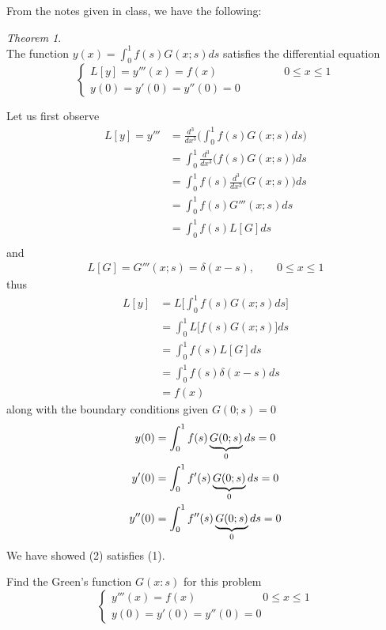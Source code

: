 \documentclass[12pt]{article}
\newenvironment{subproblem}[2][Part]{\begin{trivlist}
  \item[\hskip \labelsep {\bfseries #1}\hskip \labelsep {\bfseries (#2)}]}{\end{trivlist}}
\newenvironment{solution}[1][Solution]{\begin{trivlist}
  \item[\hskip \labelsep {\bfseries #1} \hskip \labelsep]}{\end{trivlist}}
\theoremstyle{remark}
\newtheorem*{theorem*}{Theorem}
\begin{document}
\begin{solution}
  $ $\\
  From the notes given in class, we have the following:
  \begin{theorem*}{}
    $ $\\
    The function \(y(x) = \int_{0}^{1}f(s)G(x;s)ds\)
    satisfies the differential equation
    \[
      \left\{
        \begin{array}{ll}
          L[y] = y'''(x) = f(x) \qquad\qquad\qquad 0 \le x \le 1 \\
          y(0) = y'(0) = y''(0) = 0
        \end{array}
      \right.
    \]
  \end{theorem*}
  $ $\\
  Let us first observe
  \begin{align*}
    L[y] = y''' &= \frac{d^3}{dx^3}\big(\int_{0}^{1}f(s)G(x;s)ds\big) \\
                &= \int_{0}^{1}\frac{d^3}{dx^3}\big(f(s)G(x;s)\big)ds \\
                &= \int_{0}^{1}f(s)\frac{d^3}{dx^3}\big(G(x;s)\big)ds \\
                &= \int_{0}^{1}f(s)G'''(x;s)ds \\    
                &= \int_{0}^{1}f(s)L[G]ds \\
  \end{align*}
  and
  \begin{align*}
    L[G] = G'''(x;s) = \delta(x-s), \qquad 0 \le x \le 1
  \end{align*}
  thus
  \begin{align*}
    L[y] &= L\bigg[\int_{0}^{1}f(s)G(x;s)ds \bigg] \\
         &= \int_{0}^{1}L\bigg[f(s)G(x;s)\bigg] ds \\
         &= \int_{0}^{1}f(s)L[G]ds \\
         &= \int_{0}^{1}f(s)\delta(x-s)ds \\
         &= f(x)
  \end{align*}
  along with the boundary conditions given \(G(0;s) = 0\)
  \begin{align*}
    y(0) &= \int_{0}^{1}f(s)\underbrace{G(0;s)}_{\text 0}ds = 0 \\
    y'(0) &= \int_{0}^{1}f'(s)\underbrace{G(0;s)}_{\text 0}ds = 0 \\
    y''(0) &= \int_{0}^{1}f''(s)\underbrace{G(0;s)}_{\text 0}ds = 0 \\
  \end{align*}
  We have showed (2) satisfies (1).
\end{solution}
\clearpage
\begin{subproblem}{b}
  Find the Green's function \(G(x:s)\) for this problem
  \[
    \left\{
      \begin{array}{ll}
        y'''(x) = f(x) \qquad\qquad\qquad 0 \le x \le 1 \\
        y(0) = y'(0) = y''(0) = 0
      \end{array}
    \right.
  \]
\end{subproblem}
\end{document}
